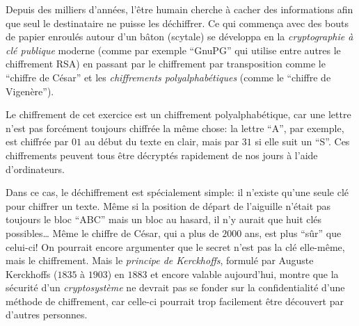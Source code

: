 \documentclass[a4paper,11pt]{report}
\begin{document}
Depuis des milliers d’années, l’être humain cherche à cacher des informations afin que seul le destinataire ne puisse les déchiffrer. Ce qui commença avec des bouts de papier enroulés autour d’un bâton (scytale) se développa en la \emph{cryptographie à clé publique} moderne (comme par exemple “GnuPG” qui utilise entre autres le chiffrement RSA) en passant par le chiffrement par transposition comme le “chiffre de César” et les \emph{chiffrements polyalphabétiques} (comme le “chiffre de Vigenère”).

Le chiffrement de cet exercice est un chiffrement polyalphabétique, car une lettre n’est pas forcément toujours chiffrée la même chose: la lettre “A”, par exemple, est chiffrée par $01$ au début du texte en clair, mais par $31$ si elle suit un “S”. Ces chiffrements peuvent tous être décryptés rapidement de nos jours à l’aide d’ordinateurs.

Dans ce cas, le déchiffrement est spécialement simple: il n’existe qu’une seule clé pour chiffrer un texte. Même si la position de départ de l’aiguille n’était pas toujours le bloc “ABC” mais un bloc au hasard, il n’y aurait que huit clés possibles… Même le chiffre de César, qui a plus de $2000$ ans, est plus “sûr” que celui-ci! On pourrait encore argumenter que le secret n’est pas la clé elle-même, mais le chiffrement. Mais le \emph{principe de Kerckhoffs}, formulé par Auguste Kerckhoffs ($1835$ à $1903$) en $1883$ et encore valable aujourd’hui, montre que la sécurité d’un \emph{cryptosystème} ne devrait pas se fonder sur la confidentialité d’une méthode de chiffrement, car celle-ci pourrait trop facilement être découvert par d’autres personnes.
\end{document}
